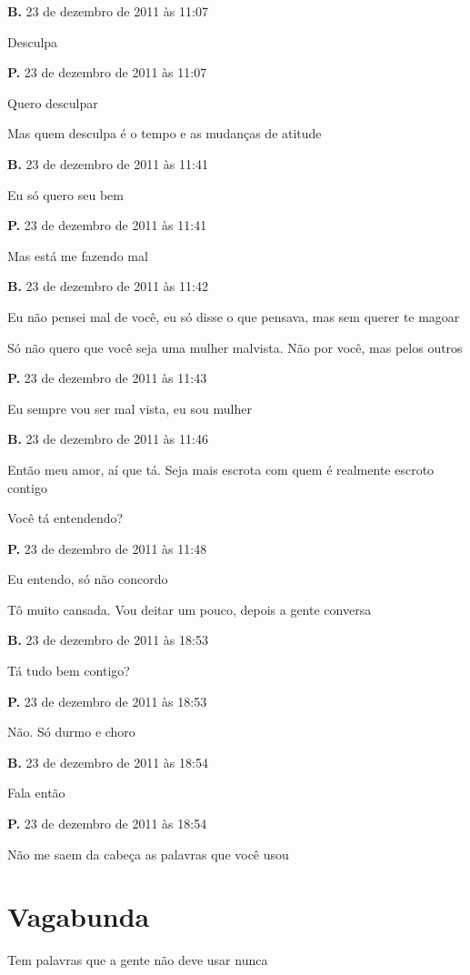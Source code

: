 {\parindent0pt\parskip1pt\raggedright
\textbf{B.} 23 de dezembro de 2011 às 11:07

Desculpa

\textbf{P.} 23 de dezembro de 2011 às 11:07

Quero desculpar

Mas quem desculpa é o tempo e as mudanças de atitude

\textbf{B.} 23 de dezembro de 2011 às 11:41

Eu só quero seu bem

\textbf{P.} 23 de dezembro de 2011 às 11:41

Mas está me fazendo mal

\textbf{B.} 23 de dezembro de 2011 às 11:42

Eu não pensei mal de você, eu só disse o que pensava, mas sem querer te
magoar

Só não quero que você seja uma mulher malvista. Não por você, mas pelos
outros

\textbf{P.} 23 de dezembro de 2011 às 11:43

Eu sempre vou ser mal vista, eu sou mulher

\textbf{B.} 23 de dezembro de 2011 às 11:46

Então meu amor, aí que tá. Seja mais escrota com quem é realmente
escroto contigo

Você tá entendendo?

\textbf{P.} 23 de dezembro de 2011 às 11:48

Eu entendo, só não concordo

Tô muito cansada. Vou deitar um pouco, depois a gente conversa

\textbf{B.} 23 de dezembro de 2011 às 18:53

Tá tudo bem contigo?

\textbf{P.} 23 de dezembro de 2011 às 18:53

Não. Só durmo e choro

\textbf{B.} 23 de dezembro de 2011 às 18:54

Fala então

\textbf{P.} 23 de dezembro de 2011 às 18:54

Não me saem da cabeça as palavras que você usou
}

\chapter{Vagabunda}

Tem palavras que a gente não deve usar nunca

